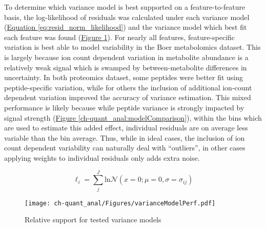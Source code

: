 To determine which variance model is best supported on a feature-to-feature basis, the log-likelihood of residuals was calculated under each variance model (\hyperref[eq:resid_norm_likelihood]{Equation \ref{eq:resid_norm_likelihood}}) and the variance model which best fit each feature was found (\hyperref[ch-quant_anal:modelFits]{Figure \ref{ch-quant_anal:modelFits}}). For nearly all features, feature-specific variation is best able to model variability in the Boer metabolomics dataset. This is largely because ion count dependent variation in metabolite abundance is a relatively weak signal which is swamped by between-metabolite differences in uncertainty.  In both proteomics dataset, some peptides were better fit using peptide-specific variation, while for others the inclusion of additional ion-count dependent variation improved the accuracy of variance estimation. This mixed performance is likely because while peptide variance is strongly impacted by signal strength (\hyperref[ch-quant_anal:modelComparison]{Figure \ref{ch-quant_anal:modelComparison}}), within the bins which are used to estimate this added effect, individual residuals are on average less variable than the bin average. Thus, while in ideal cases, the inclusion of ion count dependent variability can naturally deal with ``outliers'', in other cases applying weights to individual residuals only adds extra noise. 

\begin{equation}
\ell_{i} = \sum_{j}^{J}\text{ln}\mathcal{N}(x = 0; \mu = 0, \sigma = \sigma_{ij})\label{eq:resid_norm_likelihood}
\end{equation}

\begin{figure}[h!]
\begin{center}
\texttt{[image: ch-quant\_anal/Figures/varianceModelPerf.pdf]}
\caption[Relative support for tested variance models]{Relative support for tested variance models}
\label{ch-quant_anal:modelFits}
\end{center}
\end{figure}

